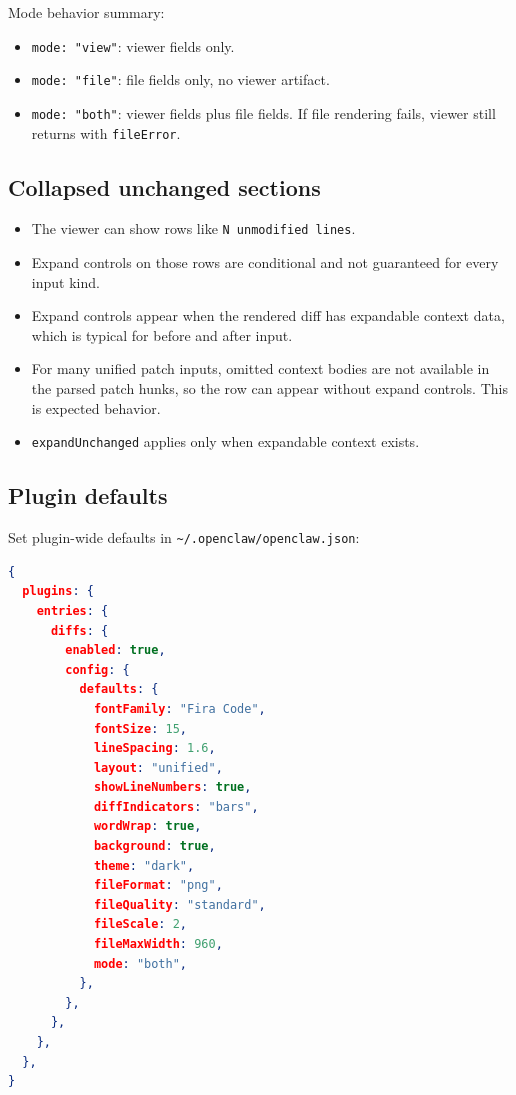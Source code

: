 Mode behavior summary:

\begin{itemize}
  \item \texttt{mode: "view"}: viewer fields only.
  \item \texttt{mode: "file"}: file fields only, no viewer artifact.
  \item \texttt{mode: "both"}: viewer fields plus file fields. If file rendering fails, viewer still returns with \texttt{fileError}.
\end{itemize}


\subsection{Collapsed unchanged sections}


\begin{itemize}
  \item The viewer can show rows like \texttt{N unmodified lines}.
  \item Expand controls on those rows are conditional and not guaranteed for every input kind.
  \item Expand controls appear when the rendered diff has expandable context data, which is typical for before and after input.
  \item For many unified patch inputs, omitted context bodies are not available in the parsed patch hunks, so the row can appear without expand controls. This is expected behavior.
  \item \texttt{expandUnchanged} applies only when expandable context exists.
\end{itemize}


\subsection{Plugin defaults}


Set plugin-wide defaults in \texttt{\textasciitilde{}/.openclaw/openclaw.json}:

\begin{lstlisting}[language=json]
{
  plugins: {
    entries: {
      diffs: {
        enabled: true,
        config: {
          defaults: {
            fontFamily: "Fira Code",
            fontSize: 15,
            lineSpacing: 1.6,
            layout: "unified",
            showLineNumbers: true,
            diffIndicators: "bars",
            wordWrap: true,
            background: true,
            theme: "dark",
            fileFormat: "png",
            fileQuality: "standard",
            fileScale: 2,
            fileMaxWidth: 960,
            mode: "both",
          },
        },
      },
    },
  },
}
\end{lstlisting}



